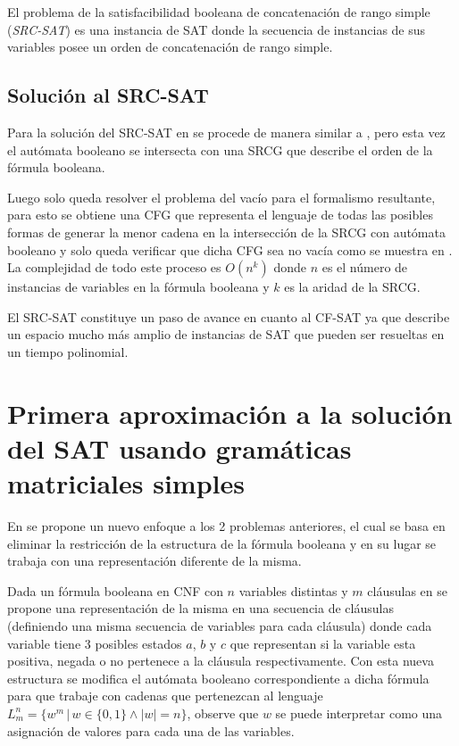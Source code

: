 El problema de la satisfacibilidad booleana de concatenación de rango simple (\textit{SRC-SAT}) es una instancia de
SAT donde la secuencia de instancias de sus variables posee un orden de concatenación de rango simple.

\subsection{Solución al SRC-SAT}

Para la solución del SRC-SAT en \cite{aSRCSAT} se procede de manera similar a \cite{aCFSAT}, pero esta vez el autómata
booleano se intersecta con una SRCG que describe el orden de la fórmula booleana.

Luego solo queda resolver el problema del vacío para el formalismo resultante, para esto se obtiene una CFG
que representa el lenguaje de todas las posibles formas de generar la menor cadena en la intersección de la SRCG
con autómata booleano y solo queda verificar que dicha CFG sea no vacía como se muestra en \cite{aCFSAT}. La complejidad
de todo este proceso es $O(n^k)$ donde $n$ es el número de instancias de variables en la fórmula booleana y $k$ es
la aridad de la SRCG.

El SRC-SAT constituye un paso de avance en cuanto al CF-SAT ya que describe un espacio mucho más amplio de instancias de SAT
que pueden ser resueltas en un tiempo polinomial.

\section{Primera aproximación a la solución del SAT usando gramáticas matriciales simples}

En \cite{aSMSAT} se propone un nuevo enfoque a los 2 problemas anteriores, el cual se basa en eliminar la restricción
de la estructura de la fórmula booleana y en su lugar se trabaja con una representación diferente de la misma.

Dada un fórmula booleana en CNF con $n$ variables distintas y $m$ cláusulas en \cite{aSMSAT} se propone una representación de la misma
en una secuencia de cláusulas (definiendo una misma secuencia de variables para cada cláusula) donde cada variable tiene
3 posibles estados $a$, $b$ y $c$ que representan si la variable esta positiva, negada o no pertenece a la cláusula
respectivamente. Con esta nueva estructura se modifica el autómata booleano correspondiente a dicha fórmula para que trabaje con
cadenas que pertenezcan al lenguaje $L^n_m=\{w^m\,|\,w\in\{0,1\} \wedge |w|=n\}$, observe que $w$ se puede interpretar como una
asignación de valores para cada una de las variables.


